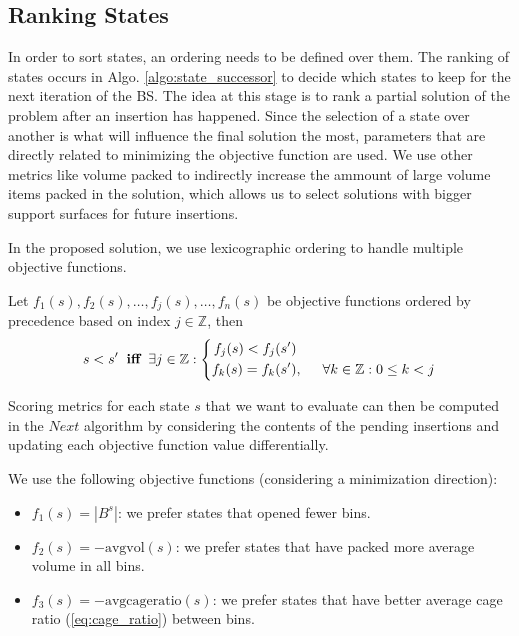 



\subsection{Ranking States}
\label{ssec:scoring_states}%
In order to sort states, an ordering needs to be defined over them.
The ranking of states occurs in Algo. \ref{algo:state_successor} to decide which states to keep for the next iteration of the BS.
The idea at this stage is to rank a partial solution of the problem after an insertion has happened. 
Since the selection of a state over another is what will influence the final solution the most, parameters that are directly related to minimizing the objective function are used.
We use other metrics like volume packed to indirectly increase the ammount of large volume items packed in the solution, which allows us to select solutions with bigger support surfaces for future insertions.

In the proposed solution, we use lexicographic ordering to handle multiple objective functions.
\begin{definition}
    \label{def:lexicographic_ordering}
    Let $f_1(s), f_2(s), \dots, f_j(s), \dots, f_n(s)$ be objective functions ordered by precedence based on index $j \in \mathbb{Z}$, then 
    \begin{equation*}
        s < s^\prime \hspace{.2cm} \textbf{iff} \hspace{.2cm} \exists j \in \mathbb{Z} : \left\{
            \begin{aligned}
                f_j(s) < f_j(s^\prime) & \\
                f_k(s) = f_k(s^\prime) &,\hspace{.5cm} \forall k \in \mathbb{Z} : 0 \le k < j 
            \end{aligned}
        \right.
    \end{equation*}
\end{definition}

Scoring metrics for each state $s$ that we want to evaluate can then be computed in the $Next$ algorithm by considering the contents of the pending insertions and updating each objective function value differentially.

We use the following objective functions (considering a minimization direction):
\begin{itemize}
    \item $f_1(s) = |B^s|$: we prefer states that opened fewer bins.
    \item $f_2(s) = -\text{avgvol}(s)$: we prefer states that have packed more average volume in all bins.
    \item $f_3(s) = -\text{avgcageratio}(s)$: we prefer states that have better average cage ratio (\cref{eq:cage_ratio}) between bins.
\end{itemize}

